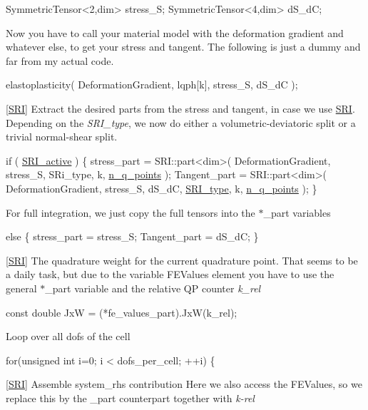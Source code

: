 \begin{DoxyCode}
SymmetricTensor<2,dim> stress\_S;
SymmetricTensor<4,dim> dS\_dC;
\end{DoxyCode}
 Now you have to call your material model with the deformation gradient and whatever else, to get your stress and tangent. The following is just a dummy and far from my actual code. 
\begin{DoxyCode}
elastoplasticity( DeformationGradient, lqph[k], stress\_S, dS\_dC );
\end{DoxyCode}
 \mbox{[}\hyperlink{namespaceSRI}{S\+RI}\mbox{]} Extract the desired parts from the stress and tangent, in case we use \hyperlink{namespaceSRI}{S\+RI}. Depending on the {\itshape S\+R\+I\+\_\+type}, we now do either a volumetric-\/deviatoric split or a trivial normal-\/shear split. 
\begin{DoxyCode}
\textcolor{keywordflow}{if} ( \hyperlink{assembly__routine__SRI_8cc_a535468030220abae9305a26e9d7f7401}{SRI\_active} )
\{
   stress\_part = SRI::part<dim>( DeformationGradient, stress\_S, SRi\_type, k, 
      \hyperlink{assembly__routine__SRI_8cc_afd52b693751274175b93a58458201e6b}{n\_q\_points} );
   Tangent\_part = SRI::part<dim>( DeformationGradient, stress\_S, dS\_dC, \hyperlink{assembly__routine__SRI_8cc_a163566963ded80f68a5bbc6d04ce0adf}{SRI\_type}, k, 
      \hyperlink{assembly__routine__SRI_8cc_afd52b693751274175b93a58458201e6b}{n\_q\_points} );
\}
\end{DoxyCode}
 For full integration, we just copy the full tensors into the $\ast$\+\_\+part variables 
\begin{DoxyCode}
\textcolor{keywordflow}{else}
\{
   stress\_part = stress\_S;
   Tangent\_part = dS\_dC;
\}
\end{DoxyCode}
 \mbox{[}\hyperlink{namespaceSRI}{S\+RI}\mbox{]} The quadrature weight for the current quadrature point. That seems to be a daily task, but due to the variable F\+E\+Values element you have to use the general $\ast$\+\_\+part variable and the relative QP counter {\itshape k\+\_\+rel} 
\begin{DoxyCode}
\textcolor{keyword}{const} \textcolor{keywordtype}{double} JxW = (*fe\_values\_part).JxW(k\_rel);
\end{DoxyCode}
 Loop over all dof\textquotesingle{}s of the cell 
\begin{DoxyCode}
\textcolor{keywordflow}{for}(\textcolor{keywordtype}{unsigned} \textcolor{keywordtype}{int} i=0; i < dofs\_per\_cell; ++i)
\{
\end{DoxyCode}
 \mbox{[}\hyperlink{namespaceSRI}{S\+RI}\mbox{]} Assemble system\+\_\+rhs contribution Here we also access the F\+E\+Values, so we replace this by the \+\_\+part counterpart together with {\itshape k-\/rel} 

